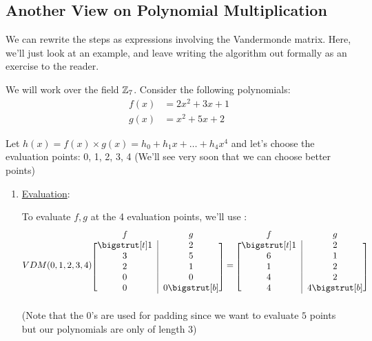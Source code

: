 \subsection{Another View on Polynomial Multiplication}
We can rewrite the steps  as expressions involving the Vandermonde matrix.
Here, we'll just look at an example, and leave writing the algorithm out formally as an exercise to the reader.

\begin{example}{}{}
    We will work over the field $\operatorname{\mathbb{Z}}_7$.
    Consider the following polynomials:
    \begin{align*}
        f(x) &= 2x^2 + 3x + 1 \\
        g(x) &= x^2 + 5x + 2
    \end{align*}

    Let $h(x) = f(x) \times g(x) = h_0 + h_1x + \ldots + h_4x^4$ and let's choose the evaluation points: 0, 1, 2, 3, 4 (We'll see very soon that we can choose better points)
    \begin{enumerate}
        \item \underline{Evaluation}:

        To evaluate $f, g$ at the 4 evaluation points, we'll use :
        \begin{equation*}
            VDM(0,1,2,3,4)
            \begin{blockarray}{cc}
                f & g \\
                \begin{block}{[c|c]}
                    \bigstrut[t] 1 & 2 \\
                    3 & 5 \\
                    2 & 1 \\
                    0 & 0 \\
                    0 & 0 \bigstrut[b] \\
                \end{block}
            \end{blockarray}
            =
            \begin{blockarray}{cc}
                f & g \\
                \begin{block}{[c|c]}
                    \bigstrut[t] 1 & 2 \\
                    6 & 1 \\
                    1 & 2 \\
                    4 & 2 \\
                    4 & 4 \bigstrut[b] \\
                \end{block}
            \end{blockarray}
        \end{equation*} 
        (Note that the $0$'s are used for padding since we want to evaluate $5$ points but our polynomials are only of length $3$)


\end{enumerate}
\end{example}
